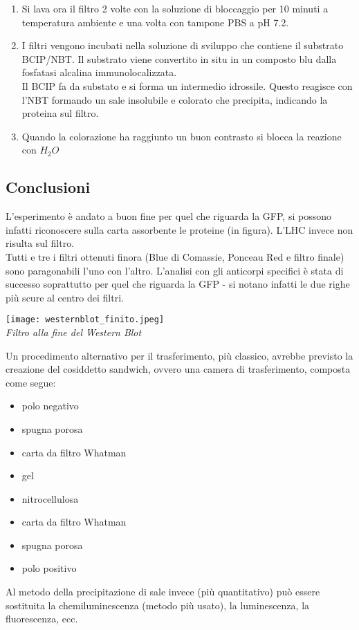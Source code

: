 \documentclass{extarticle}
\begin{document}
\begin{enumerate}
    \item Si lava ora il filtro 2 volte con la soluzione di bloccaggio per 10 minuti a temperatura ambiente e una volta con tampone PBS a pH 7.2.
    \item I filtri vengono incubati nella soluzione di sviluppo che contiene il substrato BCIP/NBT. Il substrato viene convertito in situ in un composto blu dalla fosfatasi alcalina immunolocalizzata.\\ 
    Il BCIP fa da substato e si forma un intermedio idrossile. Questo reagisce con l'NBT formando un sale insolubile e colorato che precipita, indicando la proteina sul filtro.
    \item Quando la colorazione ha raggiunto un buon contrasto si blocca la reazione con   $H_{2}O$
\end{enumerate}
\subsection*{Conclusioni}
L'esperimento è andato a buon fine per quel che riguarda la GFP, si possono infatti riconoscere sulla carta assorbente le proteine (in figura). L'LHC invece non risulta sul filtro.\\
Tutti e tre i filtri ottenuti finora (Blue di Comassie, Ponceau Red e filtro finale) sono paragonabili l'uno con l'altro. L'analisi con gli anticorpi specifici è stata di successo soprattutto per quel che riguarda la GFP - si notano infatti le due righe più scure al centro dei filtri.\\
\begin{center}
    \texttt{[image: westernblot\_finito.jpeg]}\\
    \emph{Filtro alla fine del Western Blot}
\end{center}
\begin{minipage}{0.50\textwidth}
    Un procedimento alternativo per il trasferimento, più classico, avrebbe previsto la creazione del cosiddetto sandwich, ovvero una camera di trasferimento, composta come segue:
    \begin{itemize}
        \item polo negativo
        \item spugna porosa
        \item carta da filtro Whatman
        \item gel
    \end{itemize}
\end{minipage} \hfill
\begin{minipage}{0.50 \textwidth}
    \begin{itemize}
        \item nitrocellulosa
        \item carta da filtro Whatman
        \item spugna porosa
        \item polo positivo
    \end{itemize}
    Al metodo della precipitazione di sale invece (più quantitativo) può essere sostituita la chemiluminescenza (metodo più usato), la luminescenza, la fluorescenza, ecc.
\end{minipage}
\end{document}
